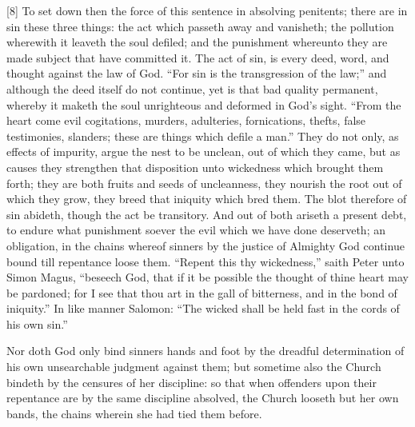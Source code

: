[8] To set down then the force of this sentence in absolving penitents; there are in sin these three things: the act which passeth away and vanisheth; the pollution wherewith it leaveth the soul defiled; and the punishment whereunto they are made subject that have committed it. The act of sin, is every deed, word, and thought against the law of God. “For sin is the transgression of the law;” and although the deed itself do not continue, yet is that bad quality permanent, whereby it maketh the soul unrighteous and deformed in God’s sight. “From the heart come evil cogitations, murders, adulteries, fornications, thefts, false testimonies, slanders; these are things which defile a man.” They do not only, as effects of impurity, argue the nest to be unclean, out of which they came, but as causes they strengthen that disposition unto wickedness which brought them forth; they are both fruits and seeds of uncleanness, they nourish the root out of which they grow, they breed that iniquity which bred them. The blot therefore of sin abideth, though the act be transitory. And out of both ariseth a present debt, to endure what punishment soever the evil which we have done deserveth;  an obligation, in the chains whereof sinners by the justice of Almighty God continue bound till repentance loose them. “Repent this thy wickedness,” saith Peter unto Simon Magus, “beseech God, that if it be possible the thought of thine heart may be pardoned; for I see that thou art in the gall of bitterness, and in the bond of iniquity.” In like manner Salomon: “The wicked shall be held fast in the cords of his own sin.”

Nor doth God only bind sinners hands and foot by the dreadful determination of his own unsearchable judgment against them; but sometime also the Church bindeth by the censures of her discipline: so that when offenders upon their repentance are by the same discipline absolved, the Church looseth but her own bands, the chains wherein she had tied them before.

